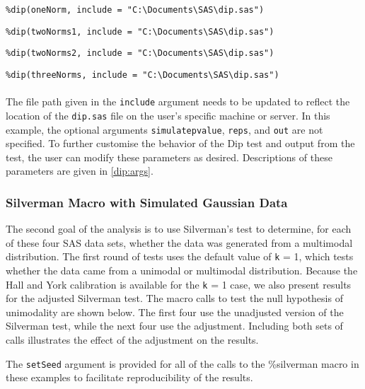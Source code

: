 \documentclass[]{interact}
\theoremstyle{plain}%
\theoremstyle{definition}
\theoremstyle{remark}
\begin{document}
\texttt{\%dip(oneNorm, include = "C:\textbackslash Documents\textbackslash SAS\textbackslash dip.sas")}

\texttt{\%dip(twoNorms1, include = "C:\textbackslash Documents\textbackslash SAS\textbackslash dip.sas")}

\texttt{\%dip(twoNorms2, include = "C:\textbackslash Documents\textbackslash SAS\textbackslash dip.sas")}

\texttt{\%dip(threeNorms, include = "C:\textbackslash Documents\textbackslash  SAS\textbackslash dip.sas")}
\paragraph*{}
The file path given in the \texttt{include} argument needs to be updated to reflect the location of the \texttt{dip.sas} file on the user's specific machine or server. In this example, the optional arguments \texttt{simulatepvalue}, \texttt{reps}, and \texttt{out} are not specified. To further customise the behavior of the Dip test and output from the test, the user can modify these parameters as desired. Descriptions of these parameters are given in \ref{dip:args}.


\subsubsection{Silverman Macro with Simulated Gaussian Data}
The second goal of the analysis is to use Silverman's test to determine, for each of these four SAS data sets, whether the data was generated from a multimodal distribution. %
The first round of tests uses the default value of \texttt{k} = 1, which tests whether the data came from a unimodal or multimodal distribution. Because the Hall and York calibration \cite{hall2001calibration} is available for the \texttt{k} = 1 case, we also present results for the adjusted Silverman test.
The macro calls to test the null hypothesis of unimodality are shown below. The first four use the unadjusted version of the Silverman test, while the next four use the adjustment. Including both sets of calls illustrates the effect of the adjustment on the results. 

The \texttt{setSeed} argument is provided for all of the calls to the \%silverman macro in these examples to facilitate reproducibility of the results. %
\end{document}
